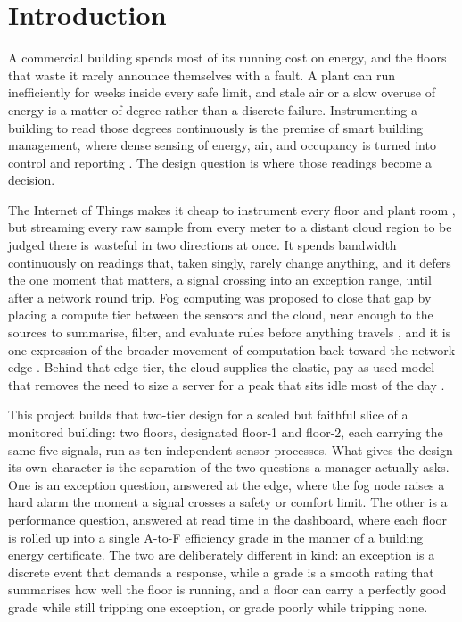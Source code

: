 \documentclass[conference]{IEEEtran}
\begin{document}
\section{Introduction}

A commercial building spends most of its running cost on energy, and the floors that waste it rarely announce themselves with a fault. A plant can run inefficiently for weeks inside every safe limit, and stale air or a slow overuse of energy is a matter of degree rather than a discrete failure. Instrumenting a building to read those degrees continuously is the premise of smart building management, where dense sensing of energy, air, and occupancy is turned into control and reporting \cite{minoli2017, agarwal2010}. The design question is where those readings become a decision.

The Internet of Things makes it cheap to instrument every floor and plant room \cite{atzori2010}, but streaming every raw sample from every meter to a distant cloud region to be judged there is wasteful in two directions at once. It spends bandwidth continuously on readings that, taken singly, rarely change anything, and it defers the one moment that matters, a signal crossing into an exception range, until after a network round trip. Fog computing was proposed to close that gap by placing a compute tier between the sensors and the cloud, near enough to the sources to summarise, filter, and evaluate rules before anything travels \cite{bonomi2012, yousefpour2019}, and it is one expression of the broader movement of computation back toward the network edge \cite{shi2016, satyanarayanan2017}. Behind that edge tier, the cloud supplies the elastic, pay-as-used model that removes the need to size a server for a peak that sits idle most of the day \cite{armbrust2010}.

This project builds that two-tier design for a scaled but faithful slice of a monitored building: two floors, designated floor-1 and floor-2, each carrying the same five signals, run as ten independent sensor processes. What gives the design its own character is the separation of the two questions a manager actually asks. One is an exception question, answered at the edge, where the fog node raises a hard alarm the moment a signal crosses a safety or comfort limit. The other is a performance question, answered at read time in the dashboard, where each floor is rolled up into a single A-to-F efficiency grade in the manner of a building energy certificate. The two are deliberately different in kind: an exception is a discrete event that demands a response, while a grade is a smooth rating that summarises how well the floor is running, and a floor can carry a perfectly good grade while still tripping one exception, or grade poorly while tripping none.
\end{document}
